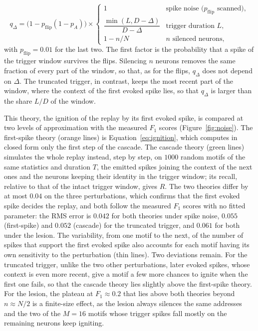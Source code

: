 \documentclass{scrartcl}
\begin{document}
\begin{equation*}
  q_\Delta = \big(1 - p_\mathrm{flip}(1 - p_A)\big) \times
  \begin{cases}
    1 & \text{spike noise ($p_\mathrm{flip}$ scanned)},\\[2pt]
    \dfrac{\min(L, D - \Delta)}{D - \Delta} & \text{trigger duration $L$},\\[8pt]
    1 - n/N & \text{$n$ silenced neurons},
  \end{cases}
\end{equation*}
with $p_\mathrm{flip} = 0.01$ for the last two. The first factor is the probability that a spike of the trigger window survives the flips. Silencing $n$ neurons removes the same fraction of every part of the window, so that, as for the flips, $q_\Delta$ does not depend on $\Delta$. The truncated trigger, in contrast, keeps the most recent part of the window, where the context of the first evoked spike lies, so that $q_\Delta$ is larger than the share $L / D$ of the window.

This theory, the ignition of the replay by its first evoked spike, is compared at two levels of approximation with the measured $F_1$ scores (Figure~\ref{fig:noise}). The first-spike theory (orange lines) is Equation~\ref{eq:ignition}, which computes in closed form only the first step of the cascade. The cascade theory (green lines) simulates the whole replay instead, step by step, on $1000$ random motifs of the same statistics and duration $T$, the emitted spikes joining the context of the next ones and the neurons keeping their identity in the trigger window; its recall, relative to that of the intact trigger window, gives $R$. The two theories differ by at most $0.04$ on the three perturbations, which confirms that the first evoked spike decides the replay, and both follow the measured $F_1$ scores with no fitted parameter: the RMS error is $0.042$ for both theories under spike noise, $0.055$ (first-spike) and $0.052$ (cascade) for the truncated trigger, and $0.061$ for both under the lesion. The variability, from one motif to the next, of the number of spikes that support the first evoked spike also accounts for each motif having its own sensitivity to the perturbation (thin lines). Two deviations remain. For the truncated trigger, unlike the two other perturbations, later evoked spikes, whose context is even more recent, give a motif a few more chances to ignite when the first one fails, so that the cascade theory lies slightly above the first-spike theory. For the lesion, the plateau at $F_1 \approx 0.2$ that lies above both theories beyond $n \approx N/2$ is a finite-size effect, as the lesion always silences the same addresses and the two of the $M = 16$ motifs whose trigger spikes fall mostly on the remaining neurons keep igniting.
\end{document}
